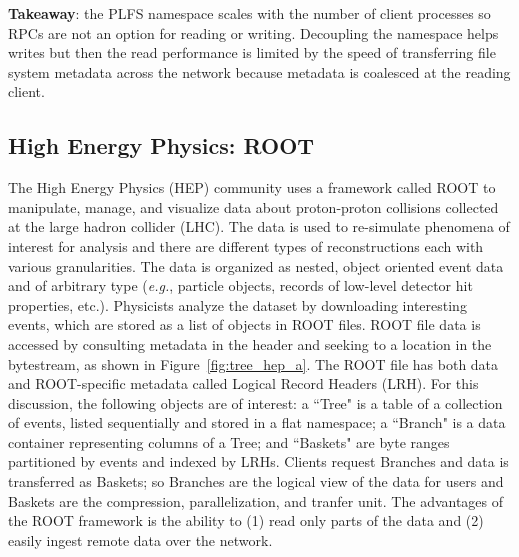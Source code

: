 \textbf{Takeaway}: the PLFS namespace scales with the number of client
processes so RPCs are not an option for reading or writing.  Decoupling the
namespace helps writes but then the read performance is limited by the speed of
transferring file system metadata across the network because metadata is
coalesced at the reading client.

\vspace{-0.5em}
\subsection{High Energy Physics: ROOT}
\label{sec:hep}
\vspace{-0.5em}

The High Energy Physics (HEP) community uses a framework called ROOT to
manipulate, manage, and visualize data about proton-proton collisions collected
at the large hadron collider (LHC). The data is used to re-simulate phenomena
of interest for analysis and there are different types of reconstructions each
with various granularities. The data is organized as nested, object oriented
event data and of arbitrary type ({\it e.g.}, particle objects, records of
low-level detector hit properties, etc.).  Physicists analyze the dataset by
downloading interesting events, which are stored as a list of objects in ROOT
files.  ROOT file data is accessed by consulting metadata in the header and
seeking to a location in the bytestream, as shown in
Figure~\ref{fig:tree_hep_a}.  The ROOT file has both data and ROOT-specific
metadata called Logical Record Headers (LRH).  For this discussion, the
following objects are of interest: a ``Tree" is a table of a collection of
events, listed sequentially and stored in a flat namespace; a ``Branch" is a
data container representing columns of a Tree; and ``Baskets" are byte ranges
partitioned by events and indexed by LRHs.  Clients request Branches and data
is transferred as Baskets; so Branches are the logical view of the data for
users and Baskets are the compression, parallelization, and tranfer unit.  The
advantages of the ROOT framework is the ability to (1) read only parts of the
data and (2) easily ingest remote data over the network.  



